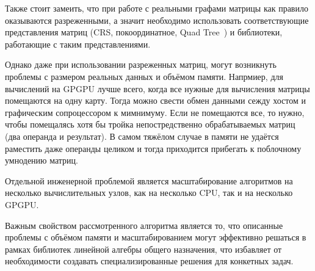 Также стоит замеить, что при работе с реальными графами матрицы как правило оказываются разреженными, а значит необходимо использовать соответствующие представления матриц (CRS, покоординатное, Quad Tree~\cite{quadtree}) и библиотеки, работающие с таким представлениями.

Однако даже при использовании разреженных матриц, могут возникнуть проблемы с размером реальных данных и объёмом памяти. Напрмиер, для вычислений на GPGPU лучше всего, когда все нужные для вычисления матрицы помещаются на одну карту. Тогда можно свести обмен данными сежду хостом и графическим сопроцессором к мимнимуму. Если не помещаются все, то нужно, чтобы помещалясь хотя бы тройка непостредственно обрабатываемых матриц (два операнда и результат). В самом тяжёлом случае в памяти не удаётся раместить даже операнды целиком и тогда приходится прибегать к поблочному умнодению матриц.

Отдельной инженерной проблемой является масштабирование алгоритмов на несколько вычислительных узлов, как на несколько CPU, так и на несколько GPGPU.

Важным свойством рассмотренного алгоритма является то, что описанные проблемы с объёмом памяти и масштабированием могут эффективно решаться в рамках библиотек линейной алгебры общего назначения, что избавляет от необходимости создавать специализированные решения для конкетных задач.


